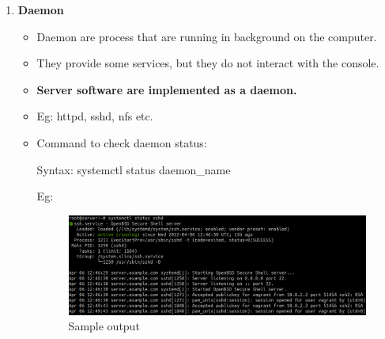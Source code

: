 \begin{flushleft}
\begin{enumerate}
\begin{itemize}
	
	\end{itemize}
\newpage
	\item \textbf{Daemon}
	\begin{itemize}
		\item Daemon are process that are running in background on the computer.
		\item They provide some services, but they do not interact with the console.
		\item \textbf{Server software are implemented as a daemon.}
		\item Eg: httpd, sshd, nfs etc.
		\item Command to check daemon status:
		\bigskip
		\begin{tcolorbox}[breakable,notitle,boxrule=-0pt,colback=pink,colframe=pink]
			\color{black}
			\font=9pt
			Syntax: systemctl status daemon\_name
			\font=4pt
		\end{tcolorbox}
		Eg:
		\begin{figure}[h!]
			\centering
			\includegraphics[scale=.25]{content/chapter12/images/proc.png}
			\caption{Sample output}
			\label{fig:process23}
		\end{figure}
	\end{itemize}
	
	

	
	
\end{enumerate}
	
		
\end{flushleft}

\newpage


